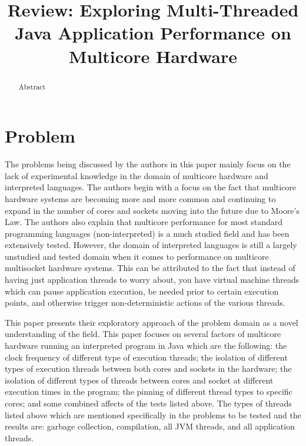 \documentclass[conference]{IEEEtran}
\begin{document}
\title{Review: Exploring Multi-Threaded Java Application Performance on Multicore Hardware}

\author{
}

\maketitle

\begin{abstract}
Abstract
\end{abstract}


\section{Problem}
\label{sec:problem}

The problems being discussed by the authors in this paper mainly focus on the lack of 
experimental knowledge in the domain of multicore hardware and interpreted languages.
The authors begin with a focus on the fact that multicore hardware systems are becoming
more and more common and continuing to expand in the number of cores and sockets moving
into the future due to Moore's Law. The authors also explain that multicore performance
for most standard programming languages (non-interpreted) is a much studied field and
has been extensively tested. However, the domain of interpreted languages is still a largely
unstudied and tested domain when it comes to performance on multicore multisocket hardware
systems. This can be attributed to the fact that instead of having just application threads to
worry about, you have virtual machine threads which can pause application execution, be needed
prior to certain execution points, and otherwise trigger non-deterministic actions of the various threads.

This paper presents their exploratory approach of the problem domain as a novel understanding of 
the field. This paper focuses on several factors of multicore hardware running an interpreted
program in Java which are the following: the clock frequency of different type of execution threads; 
the isolation of different types of execution threads between both cores and sockets in the 
hardware; the isolation of different types of threads between cores and socket at different
execution times in the program; the pinning of different thread types to specific cores; and some
combined affects of the tests listed above. The types of threads listed above which are mentioned
specifically in the problems to be tested and the results are: garbage collection, compilation, 
all JVM threads, and all application threads.
\end{document}
